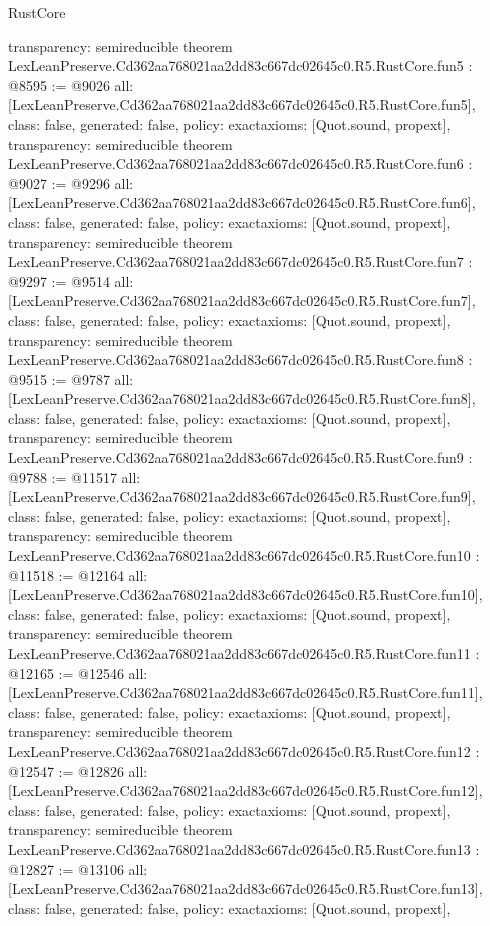 \begin{lexlean}{RustCore}
\begin{coremodule}
{  transparency: semireducible
}
theorem LexLeanPreserve.Cd362aa768021aa2dd83c667dc02645c0.R5.RustCore.fun5 : @8595 := @9026 {
  all: [LexLeanPreserve.Cd362aa768021aa2dd83c667dc02645c0.R5.RustCore.fun5],
  class: false,
  generated: false,
  policy: exact{axioms: [Quot.sound, propext]},
  transparency: semireducible
}
theorem LexLeanPreserve.Cd362aa768021aa2dd83c667dc02645c0.R5.RustCore.fun6 : @9027 := @9296 {
  all: [LexLeanPreserve.Cd362aa768021aa2dd83c667dc02645c0.R5.RustCore.fun6],
  class: false,
  generated: false,
  policy: exact{axioms: [Quot.sound, propext]},
  transparency: semireducible
}
theorem LexLeanPreserve.Cd362aa768021aa2dd83c667dc02645c0.R5.RustCore.fun7 : @9297 := @9514 {
  all: [LexLeanPreserve.Cd362aa768021aa2dd83c667dc02645c0.R5.RustCore.fun7],
  class: false,
  generated: false,
  policy: exact{axioms: [Quot.sound, propext]},
  transparency: semireducible
}
theorem LexLeanPreserve.Cd362aa768021aa2dd83c667dc02645c0.R5.RustCore.fun8 : @9515 := @9787 {
  all: [LexLeanPreserve.Cd362aa768021aa2dd83c667dc02645c0.R5.RustCore.fun8],
  class: false,
  generated: false,
  policy: exact{axioms: [Quot.sound, propext]},
  transparency: semireducible
}
theorem LexLeanPreserve.Cd362aa768021aa2dd83c667dc02645c0.R5.RustCore.fun9 : @9788 := @11517 {
  all: [LexLeanPreserve.Cd362aa768021aa2dd83c667dc02645c0.R5.RustCore.fun9],
  class: false,
  generated: false,
  policy: exact{axioms: [Quot.sound, propext]},
  transparency: semireducible
}
theorem LexLeanPreserve.Cd362aa768021aa2dd83c667dc02645c0.R5.RustCore.fun10 : @11518 := @12164 {
  all: [LexLeanPreserve.Cd362aa768021aa2dd83c667dc02645c0.R5.RustCore.fun10],
  class: false,
  generated: false,
  policy: exact{axioms: [Quot.sound, propext]},
  transparency: semireducible
}
theorem LexLeanPreserve.Cd362aa768021aa2dd83c667dc02645c0.R5.RustCore.fun11 : @12165 := @12546 {
  all: [LexLeanPreserve.Cd362aa768021aa2dd83c667dc02645c0.R5.RustCore.fun11],
  class: false,
  generated: false,
  policy: exact{axioms: [Quot.sound, propext]},
  transparency: semireducible
}
theorem LexLeanPreserve.Cd362aa768021aa2dd83c667dc02645c0.R5.RustCore.fun12 : @12547 := @12826 {
  all: [LexLeanPreserve.Cd362aa768021aa2dd83c667dc02645c0.R5.RustCore.fun12],
  class: false,
  generated: false,
  policy: exact{axioms: [Quot.sound, propext]},
  transparency: semireducible
}
theorem LexLeanPreserve.Cd362aa768021aa2dd83c667dc02645c0.R5.RustCore.fun13 : @12827 := @13106 {
  all: [LexLeanPreserve.Cd362aa768021aa2dd83c667dc02645c0.R5.RustCore.fun13],
  class: false,
  generated: false,
  policy: exact{axioms: [Quot.sound, propext]},
}
\end{coremodule}
\end{lexlean}
